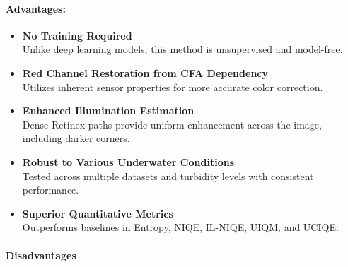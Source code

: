 \documentclass{article}
\begin{document}
\paragraph{Advantages:}
\begin{itemize}
    \item \textbf{No Training Required} \\
          Unlike deep learning models, this method is unsupervised and model-free.

    \item \textbf{Red Channel Restoration from CFA Dependency} \\
          Utilizes inherent sensor properties for more accurate color correction.

    \item \textbf{Enhanced Illumination Estimation} \\
          Dense Retinex paths provide uniform enhancement across the image, including darker corners.

    \item \textbf{Robust to Various Underwater Conditions} \\
          Tested across multiple datasets and turbidity levels with consistent performance.

    \item \textbf{Superior Quantitative Metrics} \\
          Outperforms baselines in Entropy, NIQE, IL-NIQE, UIQM, and UCIQE.
\end{itemize}

\paragraph{Disadvantages}
\end{document}
